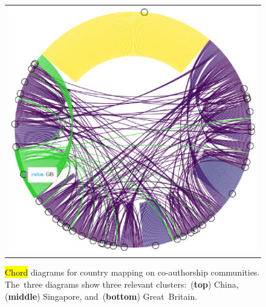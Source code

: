 \documentclass[jmse,review,accept,pdftex,moreauthors]{Definitions/mdpi}
\begin{document}
\begin{figure}[H]
\begin{tabular}{l}
	\includegraphics[height=0.3\textheight, keepaspectratio]{pics/coauthorship_country_chord_3.eps}\\
	\end{tabular}
	\caption{\hl{Chord} %
 diagrams for country mapping on co-authorship communities. The~three diagrams show three relevant clusters:~(\textbf{top}) China, (\textbf{middle}) Singapore, and~(\textbf{bottom}) Great~Britain.}\label{fig:fig7}
\end{figure}
\end{document}
